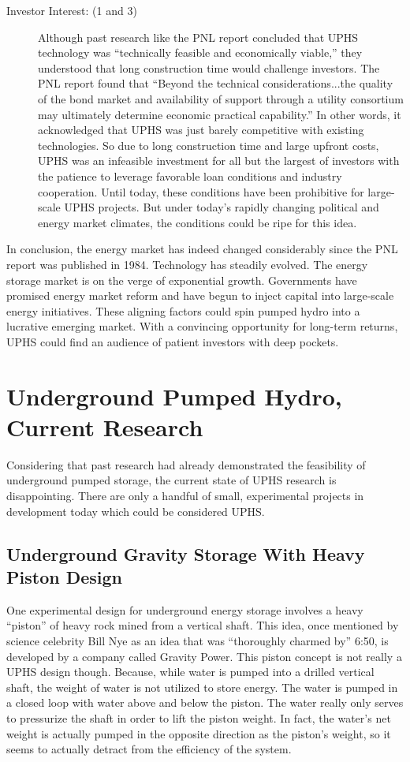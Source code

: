 \documentclass[hidelinks,12pt,a4paper]{article}
\begin{document}
{\begin{description}
    \item[Investor Interest: (1 and 3)] Although past research like the PNL report concluded that UPHS technology was “technically feasible and economically viable,” they understood that long construction time would challenge investors. The PNL report found that “Beyond the technical considerations...the quality of the bond market and availability of support through a utility consortium may ultimately determine economic practical capability.” In other words, it acknowledged that UPHS was just barely competitive with existing technologies. So due to long construction time and large upfront costs, UPHS was an infeasible investment for all but the largest of investors with the patience to leverage favorable loan conditions and industry cooperation. Until today, these conditions have been prohibitive for large-scale UPHS projects. But under today's rapidly changing political and energy market climates, the conditions could be ripe for this idea.
\end{description}
}

In conclusion, the energy market has indeed changed considerably since the PNL report was published in 1984. Technology has steadily evolved. The energy storage market is on the verge of exponential growth. Governments have promised energy market reform and have begun to inject capital into large-scale energy initiatives. These aligning factors could spin pumped hydro into a lucrative emerging market. With a convincing opportunity for long-term returns, UPHS could find an audience of patient investors with deep pockets.


\pagebreak[1]
\section{Underground Pumped Hydro, Current Research}
Considering that past research had already demonstrated the feasibility of underground pumped storage, the current state of UPHS research is disappointing. There are only a handful of small, experimental projects in development today which could be considered UPHS.

\subsection{Underground Gravity Storage With Heavy Piston Design}
One experimental design for underground energy storage involves a heavy “piston” of heavy rock mined from a vertical shaft. This idea, once mentioned by science celebrity Bill Nye as an idea that was “thoroughly charmed by” \cite{BillNyeBigThinkVideo} 6:50, is developed by a company called Gravity Power. This piston concept is not really a UPHS design though. Because, while water is pumped into a drilled vertical shaft, the weight of water is not utilized to store energy. The water is pumped in a closed loop with water above and below the piston. The water really only serves to pressurize the shaft in order to lift the piston weight. In fact, the water's net weight is actually pumped in the opposite direction as the piston's weight, so it seems to actually detract from the efficiency of the system. \cite{GravityPowerNewTakeOnPumpedHydroEnergyStorage}
\end{document}
